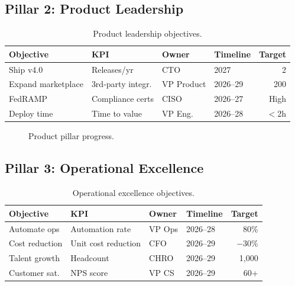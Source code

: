 \documentclass[
    language=english,
    doctype=strategic-plan,
    institution=none,
]{../../omnilatex}
\begin{document}
\subsection{Pillar 2: Product Leadership}
\begin{table}[htbp]
\centering\small
\begin{tabular}{llllr}
    \toprule
    \textbf{Objective} & \textbf{KPI} & \textbf{Owner} & \textbf{Timeline} & \textbf{Target} \\
    \midrule
    Ship v4.0         & Releases/yr        & CTO          & 2027   & 2 \\
    Expand marketplace & 3rd-party integr. & VP Product   & 2026--29 & 200 \\
    FedRAMP            & Compliance certs   & CISO         & 2026--27 & High \\
    Deploy time        & Time to value      & VP Eng.      & 2026--28 & $<$2h \\
    \bottomrule
\end{tabular}
\caption{Product leadership objectives.}
\end{table}
\begin{figure}[htbp]
\centering
{}
\caption{Product pillar progress.}
\end{figure}

\subsection{Pillar 3: Operational Excellence}
\begin{table}[htbp]
\centering\small
\begin{tabular}{llllr}
    \toprule
    \textbf{Objective} & \textbf{KPI} & \textbf{Owner} & \textbf{Timeline} & \textbf{Target} \\
    \midrule
    Automate ops   & Automation rate     & VP Ops   & 2026--28 & 80\% \\
    Cost reduction & Unit cost reduction & CFO      & 2026--29 & $-30\%$ \\
    Talent growth  & Headcount           & CHRO     & 2026--29 & 1,000 \\
    Customer sat.  & NPS score           & VP CS    & 2026--29 & 60+ \\
    \bottomrule
\end{tabular}
\caption{Operational excellence objectives.}
\end{table}
\end{document}
